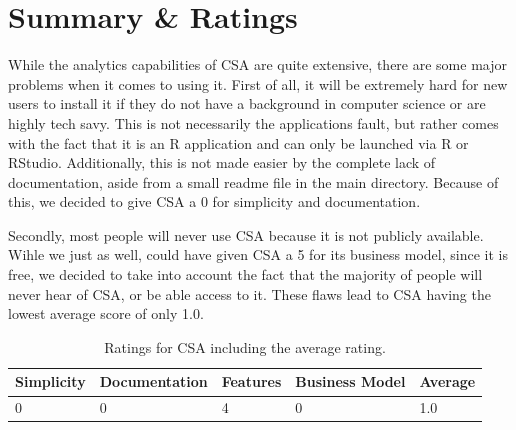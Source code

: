 \section{Summary \& Ratings}
While the analytics capabilities of CSA are quite extensive, there are some 
major problems when it comes to using it. First of all, it will be extremely 
hard for new users to install it if they do not have a background in computer 
science or are highly tech savy. This is not necessarily the applications 
fault, but rather comes with the fact that it is an R application and can only 
be launched via R or RStudio. Additionally, this is not made easier by the 
complete lack of documentation, aside from a small readme file in the main 
directory. Because of this, we decided to give CSA a 0 for simplicity and 
documentation. 

Secondly, most people will never use CSA because it is not publicly available. 
Wihle we just as well, could have given CSA a 5 for its business model, since 
it is free, we decided to take into account the fact that the majority of people
will never hear of CSA, or be able access to it. These flaws lead to CSA 
having the lowest average score of only 1.0.





\begin{table}[tp] 
\centering 
\begin{tabularx}{\linewidth}{|X|X|X|X|X|}
\hline
Simplicity & Documentation & Features & Business Model & Average \\ 
\hline 
0 & 0 & 4 & 0 & 1.0 \\ 
\hline 
\end{tabularx} 
\caption[Ratings for CSA] {
Ratings for CSA including the average rating.
} 
\label{tab:rating-CSA}
\end{table}







